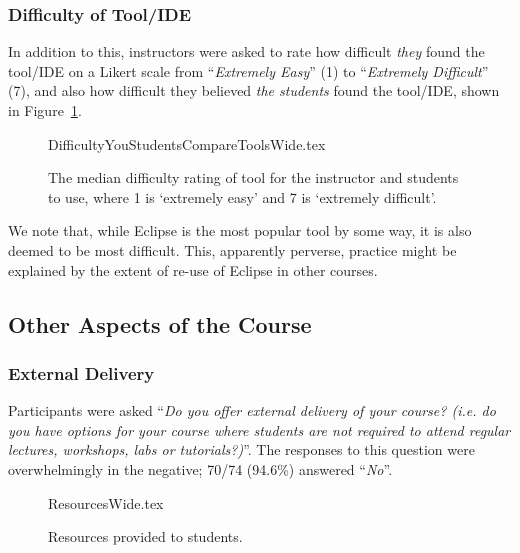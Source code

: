 \documentclass[a4paper,11pt]{article}
\begin{document}
\subsubsection{Difficulty of Tool/IDE}

In addition to this, instructors were asked to rate how difficult
{\emph{they}} found the tool/IDE on a Likert scale from
``{\emph{Extremely Easy}}'' (1) to ``{\emph{Extremely Difficult}}''
(7), and also how difficult they believed {\emph{the students}} found
the tool/IDE, shown in Figure~\ref{fig:toolhard}.

\begin{figure}
\begin{center}
{DifficultyYouStudentsCompareToolsWide.tex}
\end{center}
\caption{The median difficulty rating of tool for the instructor and students to use, where 1 is `extremely easy' and 7 is `extremely difficult'.  %
\label{fig:toolhard}}
\end{figure}

We note that, while Eclipse is the most popular tool by some way, it
is also deemed to be most difficult. This, apparently perverse,
practice might be explained by the extent of re-use of Eclipse in
other courses.


\subsection{Other Aspects of the Course}

\subsubsection{External Delivery}

Participants were asked ``{\emph{Do you offer external delivery of
your course? (i.e. do you have options for your course where students
are not required to attend regular lectures, workshops, labs or
tutorials?)}}''. The responses to this question were overwhelmingly in
the negative; 70/74 (94.6\%) answered ``{\emph{No}}''.

\begin{figure}[th]
\begin{center}
{ResourcesWide.tex}
\end{center}\vskip-18pt
\caption{Resources provided to students.\label{fig:Resources}}
\end{figure}
\end{document}
